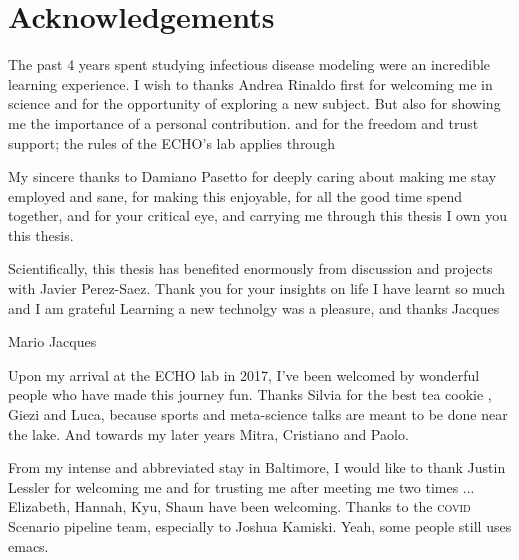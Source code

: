 \cleardoublepage

\chapter*{Acknowledgements} 
The past 4 years spent studying infectious disease modeling were an incredible  learning experience. I wish to thanks Andrea Rinaldo first for welcoming me in science and for the opportunity of exploring a new subject. But also for showing me the importance of a personal contribution.  and for the freedom and trust support; the rules of the ECHO's lab applies through
 
 My sincere thanks to Damiano Pasetto for deeply caring about  making me stay employed and sane, for making this enjoyable, for all the good time spend together, and for your critical eye, and carrying me through this thesis I own you this thesis.
 
 Scientifically, this thesis has benefited enormously from discussion and projects with Javier Perez-Saez. Thank you for your insights on life  I have learnt so much and I am grateful
 Learning a new technolgy was a pleasure, and thanks Jacques
 
 Mario Jacques
 
 Upon my arrival at the ECHO lab in 2017, I've been welcomed by wonderful people who have made this journey fun. Thanks Silvia for the best tea cookie , Giezi and Luca, because sports and meta-science talks are meant to be done near the lake. And towards my later years Mitra, Cristiano and Paolo.
 
 From my intense and abbreviated stay in Baltimore, I would like to thank Justin Lessler for welcoming me and for trusting me after meeting me two times ... Elizabeth, Hannah, Kyu, Shaun have been welcoming. Thanks to the \textsc{covid} Scenario pipeline team, especially to Joshua Kamiski. Yeah, some people still uses emacs.
 

